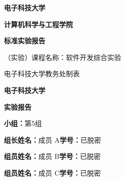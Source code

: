 \begin{titlepage}
\thispagestyle{empty}
\begin{center}
\vspace*{2.5cm}
{\bfseries 电子科技大学\par}
\vspace{1.0cm}
{\bfseries 计算机科学与工程学院\par}
\vspace{3.1cm}
{\bfseries 标\quad 准\quad 实\quad 验\quad 报\quad 告\par}
\vspace{2.5cm}
{（实验）课程名称：软件开发综合实验\par}
\vfill
{电子科技大学教务处制表\par}
\vspace{1.2cm}
\end{center}
\end{titlepage}
\clearpage
\begin{center}
{\bfseries 电\quad 子\quad 科\quad 技\quad 大\quad 学\par}
\vspace{.3em}
{\bfseries 实\quad 验\quad 报\quad 告\par}
\end{center}
\vspace{1em}
\noindent\textbf{小组：}第5组\par
\vspace{.5em}
\noindent\textbf{组长姓名：}成员 A\qquad \textbf{学号：}已脱密\par
\noindent\textbf{组员姓名：}成员 B\qquad \textbf{学号：}已脱密\par
\noindent\textbf{组员姓名：}成员 C\qquad \textbf{学号：}已脱密\par
\vspace{.8em}
